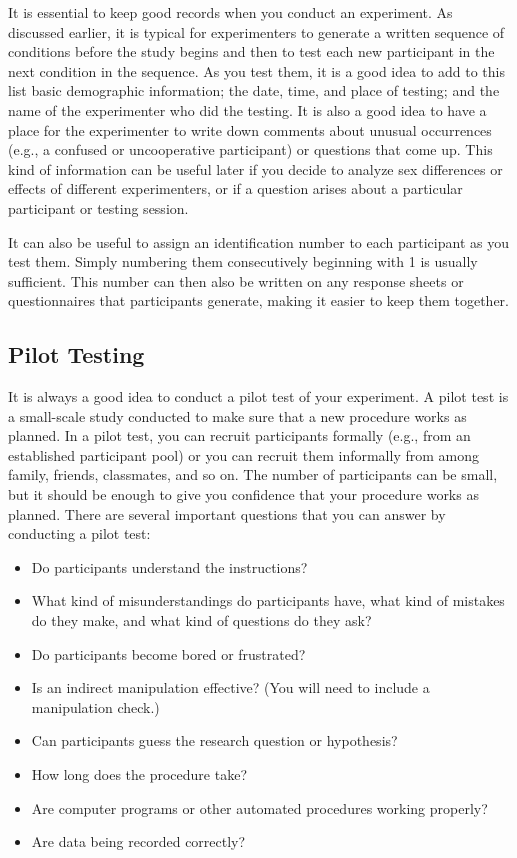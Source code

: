 It is essential to keep good records when you conduct an experiment. As discussed earlier, it is typical for experimenters to generate a written sequence of conditions before the study begins and then to test each new participant in the next condition in the sequence. As you test them, it is a good idea to add to this list basic demographic information; the date, time, and place of testing; and the name of the experimenter who did the testing. It is also a good idea to have a place for the experimenter to write down comments about unusual occurrences (e.g., a confused or uncooperative participant) or questions that come up. This kind of information can be useful later if you decide to analyze sex differences or effects of different experimenters, or if a question arises about a particular participant or testing session.

It can also be useful to assign an identification number to each participant as you test them. Simply numbering them consecutively beginning with 1 is usually sufficient. This number can then also be written on any response sheets or questionnaires that participants generate, making it easier to keep them together.

\subsection{Pilot Testing}

It is always a good idea to conduct a pilot test of your experiment. A pilot test is a small-scale study conducted to make sure that a new procedure works as planned. In a pilot test, you can recruit participants formally (e.g., from an established participant pool) or you can recruit them informally from among family, friends, classmates, and so on. The number of participants can be small, but it should be enough to give you confidence that your procedure works as planned. There are several important questions that you can answer by conducting a pilot test:

\begin{itemize}
\item Do participants understand the instructions?
\item What kind of misunderstandings do participants have, what kind of mistakes do they make, and what
kind of questions do they ask?
\item Do participants become bored or frustrated?
\item Is an indirect manipulation effective? (You will need to include a manipulation check.)
\item Can participants guess the research question or hypothesis?
\item How long does the procedure take?
\item Are computer programs or other automated procedures working properly?
\item Are data being recorded correctly?
\end{itemize}

